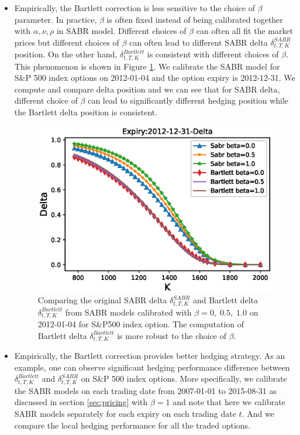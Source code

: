 \documentclass[letterpaper,12pt,titlepage,oneside,final]{book}
\numberwithin{equation}{section}
\theoremstyle{definition}
\begin{document}
\begin{itemize}
    \item Empirically, the Bartlett correction is less sensitive to the choice of $\beta$ parameter. In practice,  $\beta$ is often fixed instead of being calibrated together with $\alpha,\nu,\rho$ in SABR model. Different choices of $\beta$ can often all fit the market prices but different choices of $\beta$ can often lead to different SABR delta $\delta^{SABR}_{t,T,K}$ position. On the other hand,  $\delta^{Bartlett}_{t,T,K}$ is consistent with different choices of $\beta$. This phenomenon is shown in Figure \ref{fig:Bartlett}. We calibrate the SABR model for S\&P 500 index options  on  2012-01-04 and the option expiry is 2012-12-31. We compute and compare delta position and we can see that for SABR delta, different choice of $\beta$ can lead to  significantly different hedging position while the Bartlett delta position is consistent.
    \begin{figure}[htp!]
        \includegraphics[width=\textwidth]{./figures/Bartlett}
        \caption{Comparing the original SABR delta $\delta^{SABR}_{t,T,K}$ and Bartlett delta  $\delta^{Bartlett}_{t,T,K}$ from SABR models calibrated with $\beta=0,\; 0.5, \;1.0$ on 2012-01-04 for S\&P500 index option. The computation of Bartlett delta  $\delta^{Bartlett}_{t,T,K}$ is more robust to the choice of $\beta$.}
        \label{fig:Bartlett}
    \end{figure}
    \item  Empirically, the Bartlett correction provides better hedging strategy. As an example, one can observe significant  hedging performance difference between $\delta^{Bartlett}_{t,T,K}$ and  $\delta^{SABR}_{t,T,K}$  on S\&P 500 index options. More specifically, we calibrate the SABR models on each trading date from 2007-01-01 to 2015-08-31 as discussed in section \ref{sec:pricing} with $\beta=1$ and note that here we calibrate SABR models separately for each expiry on each trading date $t$. And we compare the local hedging performance for all the traded options.

\end{itemize}
\end{document}
